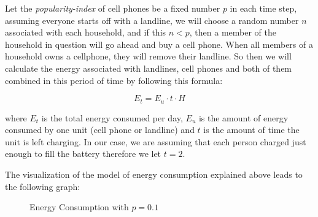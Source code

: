 \documentclass{article}
\begin{document}
Let the \textit{popularity-index} of cell phones be a fixed number $p$ in each time step, assuming everyone starts off with a landline, we will choose a random number $n$ associated with each household, and if this $n < p$, then a member of the household in question will go ahead and buy a cell phone. When all members of a household owns a cellphone, they will remove their landline. So then we will calculate the energy associated with landlines, cell phones and both of them combined in this period of time by following this formula: 

$$ E_t = E_u \cdot t \cdot H $$

where $E_t$ is the total energy consumed per day, $E_u$ is the amount of energy consumed by one unit (cell phone or landline) and $t$ is the amount of time the unit is left charging. In our case, we are assuming that each person charged just enough to fill the battery therefore we let $t = 2$. \par 
The visualization of the model of energy consumption explained above leads to the following graph:

\begin{figure}[!ht]
    \caption{Energy Consumption with $p = 0.1$}
    \label{5}
\end{figure}
\end{document}
